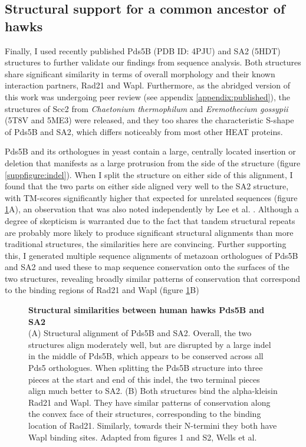 \documentclass[a4paper,11pt,twoside,openright]{scrbook}
\begin{document}
\subsection{Structural support for a common ancestor of hawks}
Finally, I used recently published Pds5B \cite{Ouyang2016} (PDB ID: 4PJU) and
SA2 \cite{Hara2014} (5HDT) structures to further validate our findings from
sequence analysis. Both structures share significant similarity in terms of
overall morphology and their known interaction partners, Rad21 and Wapl.
Furthermore, as the abridged version of this work was undergoing peer review
\cite{Wells2017} (see appendix \ref{appendix:published}), the structures of Scc2
from \textit{Chaetonium thermophilum} \cite{Kikuchi2016} and
\textit{Eremothecium gossypii} \cite{Chao2017} (5T8V and 5ME3) were released,
and they too shares the characteristic S-shape of Pds5B and SA2, which differs
noticeably from most other HEAT proteins.

Pds5B and its orthologues in yeast contain a large, centrally located insertion
or deletion that manifests as a large protrusion from the side of the structure
(figure \ref{suppfigure:indel}). When I split the structure on either side of
this alignment, I found that the two parts on either side aligned very well to
the SA2 structure, with TM-scores significantly higher that expected for
unrelated sequences (figure \ref{figure:smcstruc}A), an observation that was
also noted independently by Lee et al. \cite{Lee2016}. Although a degree of
skepticism is warranted due to the fact that tandem structural repeats are
probably more likely to produce significant structural alignments than more
traditional structures, the similarities here are convincing. Further supporting
this, I generated multiple sequence alignments of metazoan orthologues of Pds5B
and SA2 and used these to map sequence conservation onto the surfaces of the two
structures, revealing broadly similar patterns of conservation that correspond
to the binding regions of Rad21 and Wapl (figure \ref{figure:smcstruc}B)

\begin{figure}[h]
    \caption[Structural similarities between human hawks Pds5B and
    SA2]{\sffamily \textbf{Structural similarities between human hawks Pds5B and
    SA2} \\ \small (A) Structural alignment of Pds5B and SA2. Overall, the two
    structures align moderately well, but are disrupted by a large indel in the
    middle of Pds5B, which appears to be conserved across all Pds5 orthologues.
    When splitting the Pds5B structure into three pieces at the start and end of
    this indel, the two terminal pieces align much better to SA2. (B) Both
    structures bind the alpha-kleisin Rad21 and Wapl. They have similar patterns
    of conservation along the convex face of their structures, corresponding to
    the binding location of Rad21. Similarly, towards their N-termini they both
    have Wapl binding sites. Adapted from figures 1 and S2, Wells et al.
    \cite{Wells2017}} \label{figure:smcstruc} \end{figure}
\end{document}
